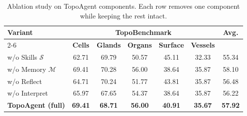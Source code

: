 \begin{table}[t]
    \centering
    \small
    \caption{Ablation study on TopoAgent components.
    Each row removes one component while keeping the rest intact.}
    \label{tab:ablation}
    \setlength{\tabcolsep}{5pt}
    \begin{tabular}{@{}l ccccc c@{}}
        \toprule
        \multirow{2}{*}{\textbf{Variant}}
        & \multicolumn{5}{c}{\textbf{TopoBenchmark}}
        & \multirow{2}{*}{\textbf{Avg.}} \\
        \cmidrule(lr){2-6}
        & \textbf{Cells} & \textbf{Glands} & \textbf{Organs} & \textbf{Surface} & \textbf{Vessels} & \\
        \midrule
        w/o Skills $\mathcal{S}$        & 62.71 & 69.79 & 50.57 & 45.11 & 32.33 & 55.34 \\
        w/o Memory $\mathcal{M}$        & 69.41 & 70.28 & 56.00 & 38.64 & 35.87 & 58.10 \\
        w/o Reflect                      & 64.71 & 70.24 & 51.77 & 43.81 & 35.87 & 56.48 \\
        w/o Interpret                    & 65.97 & 67.65 & 54.37 & 38.64 & 35.87 & 56.22 \\
        \midrule
        \textbf{TopoAgent (full)}       & \textbf{69.41} & \textbf{68.71} & \textbf{56.00} & \textbf{40.91} & \textbf{35.67} & \textbf{57.92} \\
        \bottomrule
    \end{tabular}
\end{table}
